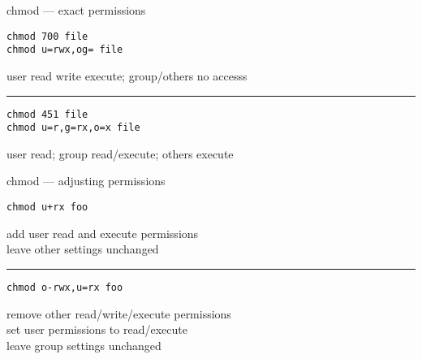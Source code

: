 \begin{frame}[fragile]{chmod --- exact permissions}
\begin{Verbatim}
chmod 700 file
chmod u=rwx,og= file
\end{Verbatim}
user read write execute; group/others no accesss
    \vspace{.1cm}
\hrule
\begin{Verbatim}
chmod 451 file
chmod u=r,g=rx,o=x file
\end{Verbatim}
user read; group read/execute; others execute
\end{frame}

\begin{frame}[fragile]{chmod --- adjusting permissions}
\begin{Verbatim}
chmod u+rx foo
\end{Verbatim}
add user read and execute permissions \\
leave other settings unchanged
    \vspace{.1cm}
\hrule
\begin{Verbatim}
chmod o-rwx,u=rx foo
\end{Verbatim}
remove other read/write/execute permissions \\
set user permissions to read/execute \\
leave group settings unchanged
\end{frame}
